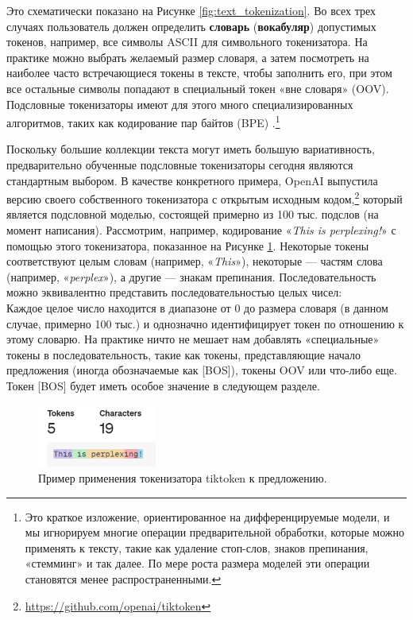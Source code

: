 Это схематически показано на Рисунке \ref{fig:text_tokenization}. Во всех трех случаях пользователь должен определить \textbf{словарь} (\textbf{вокабуляр}) допустимых токенов, например, все символы ASCII для символьного токенизатора. На практике можно выбрать желаемый размер словаря, а затем посмотреть на наиболее часто встречающиеся токены в тексте, чтобы заполнить его, при этом все остальные символы попадают в специальный токен «вне словаря» (OOV). Подсловные токенизаторы имеют для этого много специализированных алгоритмов, таких как кодирование пар байтов (BPE) \cite{shibata1999byte}.\footnote{Это краткое изложение, ориентированное на дифференцируемые модели, и мы игнорируем многие операции предварительной обработки, которые можно применять к тексту, такие как удаление стоп-слов, знаков препинания, «стемминг» и так далее. По мере роста размера моделей эти операции становятся менее распространенными.}

Поскольку большие коллекции текста могут иметь большую вариативность, предварительно обученные подсловные токенизаторы сегодня являются стандартным выбором.  В качестве конкретного примера, OpenAI выпустила версию своего собственного токенизатора с открытым исходным кодом,\footnote{\url{https://github.com/openai/tiktoken}} который является подсловной моделью, состоящей примерно из 100 тыс. подслов (на момент написания). Рассмотрим, например, кодирование «\textit{This is perplexing!}» с помощью этого токенизатора, показанное на Рисунке \ref{fig:tiktoken}. Некоторые токены соответствуют целым словам (например, «\textit{This}»), некоторые — частям слова (например, «\textit{perplex}»), а другие — знакам препинания. Последовательность можно эквивалентно представить последовательностью целых чисел:
%
\begin{equation}
[2028, 374, 74252, 287, 0]
\label{eq:list_of_indices}
\end{equation}
%
Каждое целое число находится в диапазоне от $0$ до размера словаря (в данном случае, примерно 100 тыс.) и однозначно идентифицирует токен по отношению к этому словарю. На практике ничто не мешает нам добавлять «специальные» токены в последовательность, такие как токены, представляющие начало предложения (иногда обозначаемые как [BOS]), токены OOV или что-либо еще. Токен [BOS] будет иметь особое значение в следующем разделе.

\begin{figure}
    \centering
    \hspace{1em}\includegraphics[width=0.35\textwidth]{images/tiktoken}
    \caption{Пример применения токенизатора tiktoken к предложению.}
    \label{fig:tiktoken}
\end{figure}


